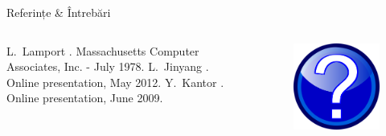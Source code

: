 \documentclass[9pt]{beamer}
\begin{document}
\begin{frame}{Referințe \& Întrebări}
  \begin{columns}
    \begin{column}[c]{0.70\textwidth}
        \begin{thebibliography}{10}    
        \beamertemplatebookbibitems
            L.~Lamport
            .
            \newblock Massachusetts Computer Associates, Inc. - July 1978.
        \beamertemplatearticlebibitems
            L.~Jinyang
            .
            \newblock Online presentation, May 2012.
        \beamertemplatearticlebibitems
            Y.~Kantor
            .
            \newblock Online presentation, June 2009.
        \end{thebibliography}
    \end{column}

    \begin{column}[c]{0.30\textwidth}
      \begin{figure}
        \includegraphics[scale=0.2]{figures/question}
      \end{figure}
    \end{column}
  \end{columns}
\end{frame}
\end{document}
